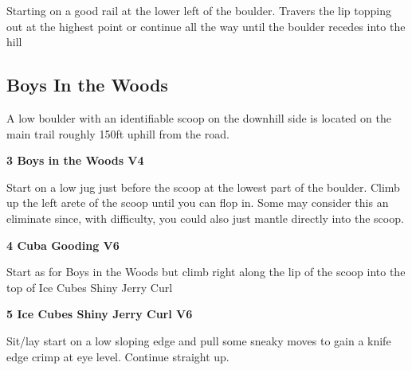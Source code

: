 \begin{multicols}{2}
\begin{minipage}{\linewidth}
					\begin{adjustwidth}{0.5cm}{}				
					Starting on a good rail at the lower left of the boulder. Travers the lip topping out at the highest point or continue all the way until the boulder recedes into the hill
					\end{adjustwidth}
					\end{minipage}

			\begin{minipage}{\columnwidth}
			\subsection*{Boys In the Woods}\label{bf:Boys In the Woods}
			A low boulder with an identifiable scoop on the downhill side is located on the main trail roughly 150ft uphill from the road.
			
			\end{minipage}
			
					\begin{minipage}{\linewidth}	
					\label{rt:Boys in the Woods}
\colorbox{RoyalBlue!20}{
\parbox{0.95\textwidth}{
\textbf{
3 Boys in the Woods V4    
}
}
}

					\begin{adjustwidth}{0.5cm}{}				
					Start on a low jug just before the scoop at the lowest part of the boulder. Climb up the left arete of the scoop until you can flop in. Some may consider this an eliminate since, with difficulty, you could also just mantle directly into the scoop.
					\end{adjustwidth}
					\end{minipage}
					\begin{minipage}{\linewidth}	
					\label{rt:Cuba Gooding}
\colorbox{RoyalBlue!20}{
\parbox{0.95\textwidth}{
\textbf{
4 Cuba Gooding V6    
}
}
}

					\begin{adjustwidth}{0.5cm}{}				
					Start as for Boys in the Woods but climb right along the lip of the scoop into the top of Ice Cubes Shiny Jerry Curl
					\end{adjustwidth}
					\end{minipage}
					\begin{minipage}{\linewidth}	
					\label{rt:Ice Cubes Shiny Jerry Curl}
\colorbox{RoyalBlue!20}{
\parbox{0.95\textwidth}{
\textbf{
5 Ice Cubes Shiny Jerry Curl V6    
}
}
}

					\begin{adjustwidth}{0.5cm}{}				
					Sit/lay start on a low sloping edge and pull some sneaky moves to gain a knife edge crimp at eye level. Continue straight up.
					\end{adjustwidth}
					\end{minipage}
			\begin{minipage}{\columnwidth}

\end{minipage}
\end{multicols}
